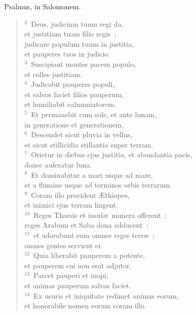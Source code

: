 \lettrine[lines=3,image=true,loversize=0.05,lraise=-0.03]{P}{}salmus, in Salomonem.
\begin{flushleft}\begin{verse}\vspace{6pt}${}^{2}$~Deus, judicium tuum regi da,\\ et justitiam tuam filio regis~;\\ judicare populum tuum in justitia,\\ et pauperes tuos in judicio.\\
${}^{3}$~Suscipiant montes pacem populo,\\ et colles justitiam.\\
${}^{4}$~Judicabit pauperes populi,\\ et salvos faciet filios pauperum,\\ et humiliabit calumniatorem.\\
${}^{5}$~Et permanebit cum sole, et ante lunam,\\ in generatione et generationem.\\
${}^{6}$~Descendet sicut pluvia in vellus,\\ et sicut stillicidia stillantia super terram.\\
${}^{7}$~Orietur in diebus ejus justitia, et abundantia pacis,\\ donec auferatur luna.\\
${}^{8}$~Et dominabitur a mari usque ad mare,\\ et a flumine usque ad terminos orbis terrarum.\\
${}^{9}$~Coram illo procident \AE thiopes,\\ et inimici ejus terram lingent.\\
${}^{10}$~Reges Tharsis et insul\ae\ munera offerent~;\\ reges Arabum et Saba dona adducent~:\\
${}^{11}$~et adorabunt eum omnes reges terr\ae~;\\ omnes gentes servient ei.\\
${}^{12}$~Quia liberabit pauperem a potente,\\ et pauperem cui non erat adjutor.\\
${}^{13}$~Parcet pauperi et inopi,\\ et animas pauperum salvas faciet.\\
${}^{14}$~Ex usuris et iniquitate redimet animas eorum,\\ et honorabile nomen eorum coram illo.\\

\end{verse}
\end{flushleft}
